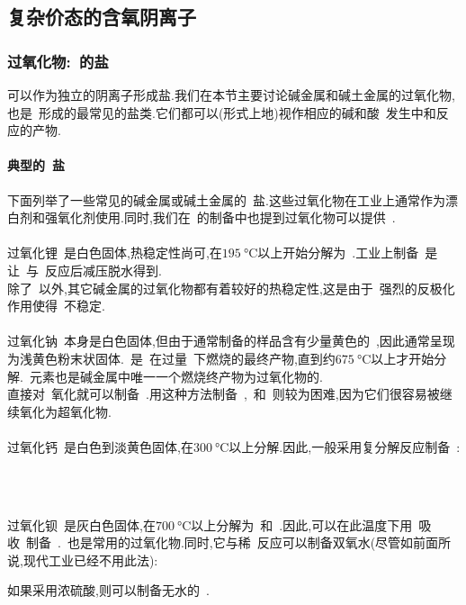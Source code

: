 \documentclass{ctexbook}
\begin{document}
\subsection{复杂价态的含氧阴离子}
\subsubsection{过氧化物:~的盐}\label{sec:过氧化物}
可以作为独立的阴离子形成盐.我们在本节主要讨论碱金属和碱土金属的过氧化物,也是~形成的最常见的盐类.它们都可以(形式上地)视作相应的碱和酸~发生中和反应的产物.
\paragraph{典型的~盐}
下面列举了一些常见的碱金属或碱土金属的~盐.这些过氧化物在工业上通常作为漂白剂和强氧化剂使用.同时,我们在~的制备中也提到过氧化物可以提供~.\\
\\
\indent 过氧化锂~是白色固体,热稳定性尚可,在$\SI{195}{\celsius}$以上开始分解为~.工业上制备~是让~与~反应后减压脱水得到.\\
\indent 除了~以外,其它碱金属的过氧化物都有着较好的热稳定性,这是由于~强烈的反极化作用使得~不稳定.\\
\\
\indent 过氧化钠~本身是白色固体,但由于通常制备的样品含有少量黄色的~,因此通常呈现为浅黄色粉末状固体.~是~在过量~下燃烧的最终产物,直到约$\SI{675}{\celsius}$以上才开始分解.~元素也是碱金属中唯一一个燃烧终产物为过氧化物的.\\
\indent 直接对~氧化就可以制备~.用这种方法制备~,~和~则较为困难,因为它们很容易被继续氧化为超氧化物.\\
\\
\indent 过氧化钙~是白色到淡黄色固体,在$\SI{300}{\celsius}$以上分解.因此,一般采用复分解反应制备~:
\begin{tightcenter}
    \\
\end{tightcenter}
\\
\indent 过氧化钡~是灰白色固体,在$\SI{700}{\celsius}$以上分解为~和~.因此,可以在此温度下用~吸收~制备~.~也是常用的过氧化物.同时,它与稀~反应可以制备双氧水(尽管如前面所说,现代工业已经不用此法):
\begin{tightcenter}
\end{tightcenter}
如果采用浓硫酸,则可以制备无水的~.
\end{document}
